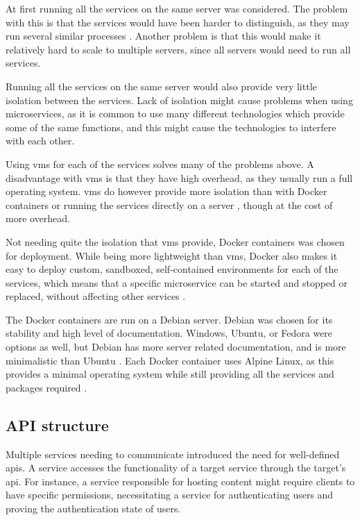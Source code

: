 At first running all the services on the same server was considered. The problem with this is that the services would have been harder to distinguish, as they may run several similar processes \citep{dockerDzone}. Another problem is that this would make it relatively hard to scale to multiple servers, since all servers would need to run all services.

Running all the services on the same server would also provide very little isolation between the services. Lack of isolation might cause problems when using microservices, as it is common to use many different technologies which provide some of the same functions, and this might cause the technologies to interfere with each other.

Using \acrshort{vm}s for each of the services solves many of the problems above. A disadvantage with \acrshort{vm}s is that they have high overhead, as they usually run a full operating system. \acrshort{vm}s do however provide more isolation than with Docker containers or running the services directly on a server \citep{devopsDockerVSVM}, though at the cost of more overhead.

Not needing quite the isolation that \acrshort{vm}s provide, Docker containers was chosen for deployment. While being more lightweight than \acrshort{vm}s, Docker also makes it easy to deploy custom, sandboxed, self-contained environments for each of the services, which means that a specific microservice can be started and stopped or replaced, without affecting other services \citep{devopsDockerVSVM}.

The Docker containers are run on a Debian server. Debian was chosen for its stability and high level of documentation. Windows, Ubuntu, or Fedora were options as well, but Debian has more server related documentation, and is more minimalistic than Ubuntu \citep{whyDebian}. Each Docker container uses Alpine Linux, as this provides a minimal operating system while still providing all the services and packages required \citep{alpineLinux}.

\subsection{API structure}
Multiple services needing to communicate introduced the need for well-defined \acrshort{api}s. A service accesses the functionality of a target service through the target's \acrshort{api}. For instance, a service responsible for hosting content might require clients to have specific permissions, necessitating a service for authenticating users and proving the authentication state of users.

